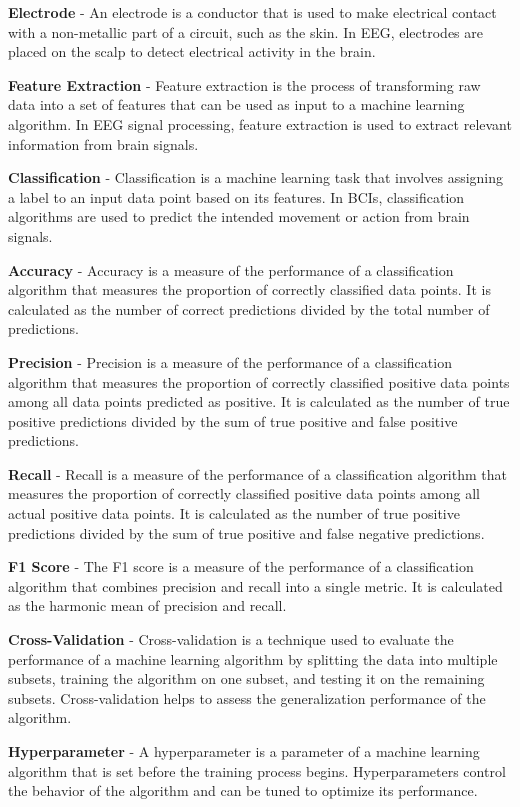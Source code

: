 \textbf{Electrode} - An electrode is a conductor that is used to make electrical contact with a non-metallic part of a circuit, such as the skin. In EEG, electrodes are placed on the scalp to detect electrical activity in the brain.

\textbf{Feature Extraction} - Feature extraction is the process of transforming raw data into a set of features that can be used as input to a machine learning algorithm. In EEG signal processing, feature extraction is used to extract relevant information from brain signals.

\textbf{Classification} - Classification is a machine learning task that involves assigning a label to an input data point based on its features. In BCIs, classification algorithms are used to predict the intended movement or action from brain signals.

\textbf{Accuracy} - Accuracy is a measure of the performance of a classification algorithm that measures the proportion of correctly classified data points. It is calculated as the number of correct predictions divided by the total number of predictions.

\textbf{Precision} - Precision is a measure of the performance of a classification algorithm that measures the proportion of correctly classified positive data points among all data points predicted as positive. It is calculated as the number of true positive predictions divided by the sum of true positive and false positive predictions.

\textbf{Recall} - Recall is a measure of the performance of a classification algorithm that measures the proportion of correctly classified positive data points among all actual positive data points. It is calculated as the number of true positive predictions divided by the sum of true positive and false negative predictions.

\textbf{F1 Score} - The F1 score is a measure of the performance of a classification algorithm that combines precision and recall into a single metric. It is calculated as the harmonic mean of precision and recall.

\textbf{Cross-Validation} - Cross-validation is a technique used to evaluate the performance of a machine learning algorithm by splitting the data into multiple subsets, training the algorithm on one subset, and testing it on the remaining subsets. Cross-validation helps to assess the generalization performance of the algorithm.

\textbf{Hyperparameter} - A hyperparameter is a parameter of a machine learning algorithm that is set before the training process begins. Hyperparameters control the behavior of the algorithm and can be tuned to optimize its performance.

